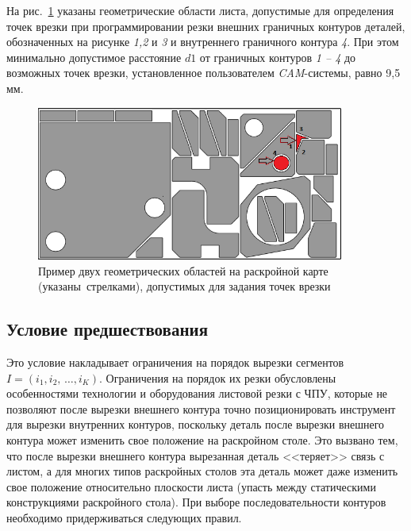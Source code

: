 \documentclass[11pt,twoside,openany]{report}
\begin{document}
На рис.~\ref{pierce-area}
указаны геометрические области листа,
допустимые для определения точек врезки при программировании резки
внешних граничных контуров деталей,
обозначенных на рисунке
\textit{1,2} и \textit{3}
и внутреннего граничного контура
\textit{4}.
При этом минимально допустимое расстояние $d1$
от граничных контуров
\textit{1 -- 4} до возможных точек врезки,
установленное пользователем
\textit{CAM}-системы, равно 9,5 мм.

\begin{figure}[h]
  \begin{center}
  \includegraphics[width=0.9\textwidth]{pierce-area.png}
  \caption{
    Пример двух геометрических областей на раскройной карте
    (указаны~стрелками),
    допустимых для задания точек врезки
  }
  \label{pierce-area}
  \end{center}
\end{figure}

{\raggedright\subsection{
  Условие предшествования
}}

Это условие накладывает ограничения на порядок вырезки сегментов
$ I = (i_1, i_2, \,\dots, i_K)$.
Ограничения на порядок их резки обусловлены особенностями
технологии и оборудования листовой резки с ЧПУ,
которые не позволяют после вырезки внешнего контура точно
позиционировать инструмент для вырезки внутренних контуров,
поскольку деталь после вырезки внешнего контура может
изменить свое положение на раскройном столе.
Это вызвано тем, что после вырезки внешнего контура
вырезанная деталь <<теряет>> связь с листом,
а для многих типов раскройных столов эта деталь
может даже изменить свое положение относительно плоскости листа
(упасть между статическими конструкциями раскройного стола).
При выборе последовательности контуров
необходимо придерживаться следующих правил.
\end{document}
